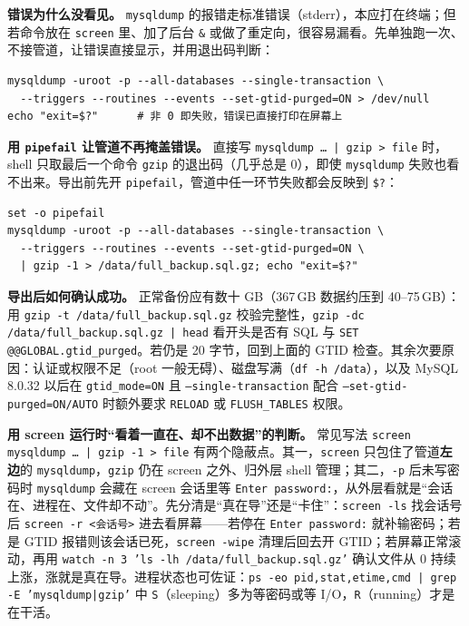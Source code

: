 \documentclass[12pt,UTF8]{ctexbook}
\begin{document}
\textbf{错误为什么没看见。} \texttt{mysqldump} 的报错走标准错误（stderr），本应打在终端；但若命令放在 \texttt{screen} 里、加了后台 \texttt{\&} 或做了重定向，很容易漏看。先单独跑一次、不接管道，让错误直接显示，并用退出码判断：

\begin{lstlisting}
mysqldump -uroot -p --all-databases --single-transaction \
  --triggers --routines --events --set-gtid-purged=ON > /dev/null
echo "exit=$?"      # 非 0 即失败，错误已直接打印在屏幕上
\end{lstlisting}

\textbf{用 \texttt{pipefail} 让管道不再掩盖错误。} 直接写 \texttt{mysqldump \ldots{} | gzip > file} 时，shell 只取最后一个命令 \texttt{gzip} 的退出码（几乎总是 0），即使 \texttt{mysqldump} 失败也看不出来。导出前先开 \texttt{pipefail}，管道中任一环节失败都会反映到 \texttt{\$?}：

\begin{lstlisting}
set -o pipefail
mysqldump -uroot -p --all-databases --single-transaction \
  --triggers --routines --events --set-gtid-purged=ON \
  | gzip -1 > /data/full_backup.sql.gz; echo "exit=$?"
\end{lstlisting}

\textbf{导出后如何确认成功。} 正常备份应有数十 GB（367\,GB 数据约压到 40--75\,GB）：用 \texttt{gzip -t /data/full\_backup.sql.gz} 校验完整性，\texttt{gzip -dc /data/full\_backup.sql.gz | head} 看开头是否有 SQL 与 \texttt{SET @@GLOBAL.gtid\_purged}。若仍是 20 字节，回到上面的 GTID 检查。其余次要原因：认证或权限不足（root 一般无碍）、磁盘写满（\texttt{df -h /data}），以及 MySQL 8.0.32 以后在 \texttt{gtid\_mode=ON} 且 \texttt{--single-transaction} 配合 \texttt{--set-gtid-purged=ON/AUTO} 时额外要求 \texttt{RELOAD} 或 \texttt{FLUSH\_TABLES} 权限。

\textbf{用 screen 运行时“看着一直在、却不出数据”的判断。} 常见写法 \texttt{screen mysqldump \ldots{} | gzip -1 > file} 有两个隐蔽点。其一，\texttt{screen} 只包住了管道\textbf{左边}的 \texttt{mysqldump}，\texttt{gzip} 仍在 screen 之外、归外层 shell 管理；其二，\texttt{-p} 后未写密码时 \texttt{mysqldump} 会藏在 screen 会话里等 \texttt{Enter password:}，从外层看就是“会话在、进程在、文件却不动”。先分清是“真在导”还是“卡住”：\texttt{screen -ls} 找会话号后 \texttt{screen -r <会话号>} 进去看屏幕——若停在 \texttt{Enter password:} 就补输密码；若是 GTID 报错则该会话已死，\texttt{screen -wipe} 清理后回去开 GTID；若屏幕正常滚动，再用 \texttt{watch -n 3 'ls -lh /data/full\_backup.sql.gz'} 确认文件从 0 持续上涨，涨就是真在导。进程状态也可佐证：\texttt{ps -eo pid,stat,etime,cmd | grep -E 'mysqldump|gzip'} 中 \texttt{S}（sleeping）多为等密码或等 I/O，\texttt{R}（running）才是在干活。
\end{document}
